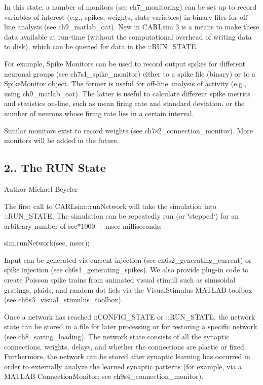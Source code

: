 In this state, a number of monitors (see ch7\+\_\+monitoring) can be set up to record variables of interest (e.\+g., spikes, weights, state variables) in binary files for off-\/line analysis (see ch9\+\_\+matlab\+\_\+oat). New in C\+A\+R\+Lsim 3 is a means to make these data available at run-\/time (without the computational overhead of writing data to disk), which can be queried for data in the \+::\+R\+U\+N\+\_\+\+S\+T\+A\+TE.

For example, Spike Monitors can be used to record output spikes for different neuronal groups (see ch7s1\+\_\+spike\+\_\+monitor) either to a spike file (binary) or to a Spike\+Monitor object. The former is useful for off-\/line analysis of activity (e.\+g., using ch9\+\_\+matlab\+\_\+oat). The latter is useful to calculate different spike metrics and statistics on-\/line, such as mean firing rate and standard deviation, or the number of neurons whose firing rate lies in a certain interval.

Similar monitors exist to record weights (see ch7s2\+\_\+connection\+\_\+monitor). More monitors will be added in the future.\hypertarget{ch2_basic_concepts_ch2s1s3_run}{}\subsection{2.. The R\+U\+N State}\label{ch2_basic_concepts_ch2s1s3_run}
\begin{DoxyAuthor}{Author}
Michael Beyeler
\end{DoxyAuthor}
The first call to C\+A\+R\+Lsim\+::run\+Network will take the simulation into \+::\+R\+U\+N\+\_\+\+S\+T\+A\+TE. The simulation can be repeatedly run (or \char`\"{}stepped\char`\"{}) for an arbitrary number of {\ttfamily sec}$\ast$1000 + {\ttfamily msec} milliseconds\+: 
\begin{DoxyCode}
sim.runNetwork(sec, msec);
\end{DoxyCode}


Input can be generated via current injection (see ch6s2\+\_\+generating\+\_\+current) or spike injection (see ch6s1\+\_\+generating\+\_\+spikes). We also provide plug-\/in code to create Poisson spike trains from animated visual stimuli such as sinusoidal gratings, plaids, and random dot fiels via the Visual\+Stimulus M\+A\+T\+L\+AB toolbox (see ch6s3\+\_\+visual\+\_\+stimulus\+\_\+toolbox).

Once a network has reached \+::\+C\+O\+N\+F\+I\+G\+\_\+\+S\+T\+A\+TE or \+::\+R\+U\+N\+\_\+\+S\+T\+A\+TE, the network state can be stored in a file for later processing or for restoring a specific network (see ch8\+\_\+saving\+\_\+loading). The network state consists of all the synaptic connections, weights, delays, and whether the connections are plastic or fixed. Furthermore, the network can be stored after synaptic learning has occurred in order to externally analyze the learned synaptic patterns (for example, via a M\+A\+T\+L\+AB Connection\+Monitor; see ch9s4\+\_\+connection\+\_\+monitor).

